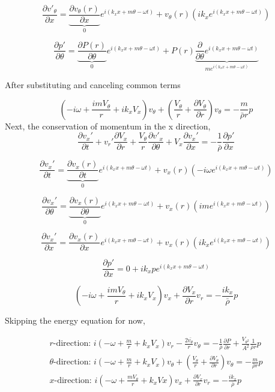 \documentclass[12pt]{article}
\begin{document}
\[\frac{\partial v'_{\theta}}{\partial x} = \underbrace{\frac{\partial v_{\theta}(r)}{\partial x}}_{0} e^{i\left(k_x x + m \theta - \omega t \right)} + v_{\theta}(r) \left(ik_x e^{i\left(k_x x + m \theta - \omega t \right)}\right)\]

\[\frac{\partial p'}{\partial \theta} = \underbrace{\frac{\partial P(r)}{\partial \theta}}_{0} e^{i\left(k_x x + m \theta - \omega t \right)} + P(r)\underbrace{\frac{\partial}{\partial  \theta} e^{i\left(k_x x + m \theta - \omega t \right)}}_{m  e^{i\left(k_x x + m \theta - \omega t \right)}}\]



After substituting and canceling common terms 

\[\left(-i\omega + \frac{i m V_{\theta}}{r} + i k_x V_x \right) v_{\theta} + \left(\frac{V_{\theta}}{r} +  \frac{\partial V_{\theta}}{\partial r}\right)v_\theta= -\frac{m}{\bar{\rho}r}p\]
Next, the conservation of momentum in the x direction,
\[\frac{\partial  v_x' }{\partial t} +
v_r' \frac{\partial  V_x  }{\partial r} +
\frac{V_{\theta}}{r} \frac{\partial v'_x}{\partial \theta} +
V_x \frac{\partial v_x'}{\partial x} 
= -\frac{1    }{\bar{\rho}}  \frac{\partial p'}{\partial x} \]


\[\frac{\partial v_x'}{\partial t} = \underbrace{\frac{\partial v_x(r)}{\partial t}}_{0} e^{i\left(k_x x + m \theta - \omega t \right)} + 
v_x(r) \left(-i\omega e^{i\left(k_x x + m \theta - \omega t \right)}\right)\]

\[\frac{\partial v_x'}{\partial \theta} = \underbrace{\frac{\partial v_x(r)}{\partial \theta}}_{0} e^{i\left(k_x x + m \theta - \omega t \right)} + 
v_x(r) \left(im e^{i\left(k_x x + m \theta - \omega t \right)}\right)\]


\[\frac{\partial v_x'}{\partial x} = \frac{\partial v_x(r)}{\partial x} e^{i\left(k_x x + m \theta - \omega t \right)} + 
v_x(r) \left(i k_x e^{i\left(k_x x + m \theta - \omega t \right)}\right)\]

\[\frac{\partial p'}{\partial x} = 0 + ik_xpe^{i\left(k_x x + m \theta - \omega t \right)} \]

\[\left(-i\omega + \frac{imV_{\theta}}{r} + i k_xV_x\right)v_x + \frac{\partial V_x}{\partial r} v_r = - \frac{i
	k_x}{\bar{\rho}}p\]


Skipping the energy equation for now,

\begin{align*}
r\text{-direction: } i\left(-\omega + \frac{ m}{r} +  k_x V_x \right) v_r - \frac{2 \bar{v_{\theta}}}{r}v_{\theta}  = -\frac{1}{\bar{\rho}} \frac{\partial P}{\partial r}+ \frac{V_{\theta^2}}{A^2}\frac{1}{\bar{\rho} r}p\\
\theta\text{-direction: } i\left(-\omega + \frac{ m}{r} +  k_x V_x \right) v_{\theta} + \left(\frac{V_{\theta}}{r} +  \frac{\partial V_{\theta}}{\partial r}\right)v_\theta= -\frac{m}{\bar{\rho}r}p \\ 
x\text{-direction: }i\left(-\omega + \frac{mV_{\theta}}{r} +  k_xVx\right)v_x + \frac{\partial V_x}{\partial r} v_r = - \frac{i
	k_x}{\bar{\rho}}p\\
\end{align*}
\end{document}
